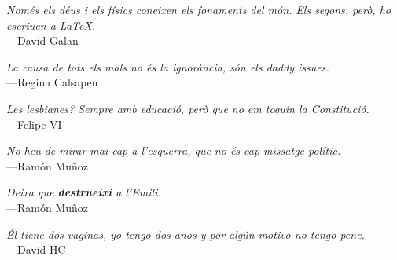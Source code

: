 \documentclass[12pt, a5paper, twoside]{book}
\newcommand{\epigraf}[2]{%
    \begin{flushright}
        \textit{#1}\\
        {\small ---#2}
    \end{flushright}
    \vspace{2em}
}
\begin{document}
\epigraf{Només els déus i els físics coneixen els fonaments del món. Els segons, però, ho escriuen a \LaTeX.}{David Galan}

\epigraf{La causa de tots els mals no és la ignorància, són els daddy issues.}{Regina Calsapeu}

\epigraf{Les lesbianes? Sempre amb educació, però que no em toquin la Constitució.}{Felipe VI}

\epigraf{No heu de mirar mai cap a l’esquerra, que no és cap missatge polític.}{Ramón Muñoz}

\epigraf{Deixa que \textbf{destrueixi} a l’Emili.}{Ramón Muñoz}

\epigraf{Él tiene dos vaginas, yo tengo dos anos y por algún motivo no tengo pene.}{David HC}
\end{document}
